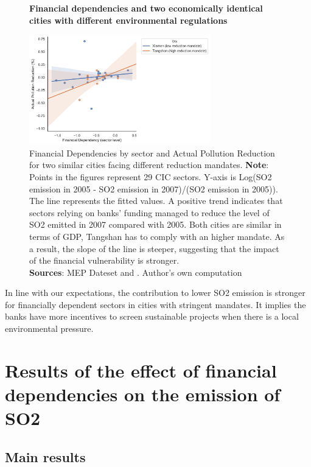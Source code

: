 \documentclass[12pt]{article}
\begin{document}
\begin{figure}[ht]
    \centering
    \textbf{Financial dependencies and two economically identical cities with different environmental regulations}\par\medskip
    \includegraphics[width=0.7\textwidth]{fig_4}
    \caption{Financial Dependencies by sector and Actual Pollution Reduction for two similar cities facing different reduction mandates.
    \textbf{Note}: Points in the figures represent 29 CIC sectors. Y-axis is Log(SO2 emission in 2005 - SO2 emission in 2007)/(SO2 emission in 2005)). The line represents the fitted values. A positive trend indicates that sectors relying on banks’ funding managed to reduce the level of SO2 emitted in 2007 compared with 2005. Both cities are similar in terms of GDP, Tangshan has to comply with an higher mandate. As a result, the slope of the line is steeper, suggesting that the impact of the financial vulnerability is stronger.\\
    \textbf{Sources}: MEP Dateset and \cite{Fan2015-bm}. Author's own computation
    }
    \label{fig:figure4}
\end{figure}

In line with our expectations, the contribution to lower SO2 emission is stronger for financially dependent sectors in cities with stringent mandates. It implies the banks have more incentives to screen sustainable projects when there is a local environmental pressure.

\section{Results of the effect of financial dependencies on the emission of SO2} \label{sec:result}

\subsection{Main results}
\end{document}
